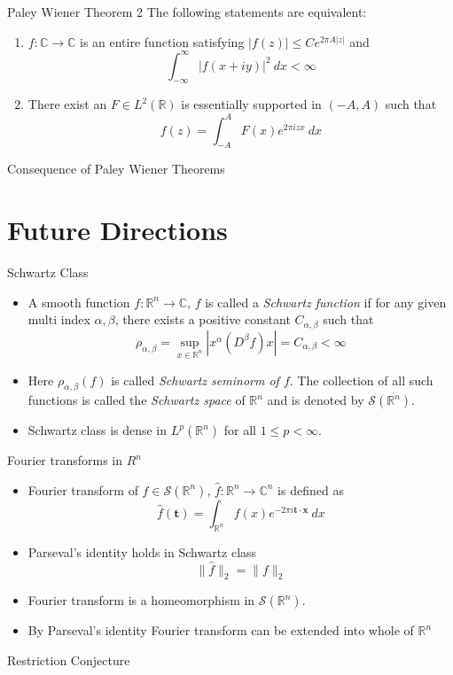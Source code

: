 \documentclass[compress]{beamer}
\newcommand{\R}{\mathbb R}
\newcommand{\C}{\mathbb C}
\begin{document}
\begin{frame}{Paley Wiener Theorem 2}
    The following statements are equivalent:
      \begin{enumerate}
        \item $f: \C \to \C$ is an entire function satisfying $|f(z)| \le Ce^{2\pi A |z|}$ and $$\int_{-\infty}^\infty |f(x+iy)|^2 \ dx < \infty$$
        \item There exist an $F \in L^2(\R)$ is essentially supported in $(-A, A)$ such that $$f(z) = \int_{-A}^A F(x) e^{2\pi iz x} \ dx$$
      \end{enumerate}
\end{frame}

\begin{frame}{Consequence of Paley Wiener Theorems}
\end{frame}


\section{Future Directions}

\begin{frame}{Schwartz Class}
  \begin{itemize}
    \item A smooth function $f:\mathbb{R}^n \to \mathbb{C}$, $f$ is called a \emph{Schwartz function} if for any given multi index $\alpha, \beta$, there exists a positive constant $C_{\alpha, \beta}$ such that $$\rho_{\alpha, \beta} = \sup_{x \in \mathbb{R}^n} \left|x^\alpha (D^\beta f)x \right| = C_{\alpha, \beta} < \infty$$
    \item Here $\rho_{\alpha, \beta}(f)$ is called \emph{Schwartz seminorm of $f$}. The collection of all such functions is called the \emph{Schwartz space} of $\mathbb{R}^n$ and is denoted by $\mathscr{S}(\mathbb{R}^n)$.
    \item Schwartz class is dense in $L^p(\R^n)$ for all $1\le p < \infty$.
  \end{itemize}
\end{frame}

\begin{frame}{Fourier transforms in $R^n$}
  \begin{itemize}
    \item Fourier transform of $f \in \mathscr{S}(\R^n)$, $\hat{f} : \R^n \to \C^n$ is defined as $$\hat{f}( \textbf{t} ) = \int_{\R^n} f(x)e^{-2 \pi i \textbf{t} \cdot \textbf{x}} \ dx$$
    \item Parseval's identity holds in Schwartz class $$\|\hat{f}\|_2 = \|f\|_2$$
    \item Fourier transform is a homeomorphism in $\mathscr{S}(\R^n)$.
    \item By Parseval's identity Fourier transform can be extended into whole of $\R^n$
  \end{itemize}
\end{frame}

\begin{frame}{Restriction Conjecture}
  
\end{frame}
\end{document}
